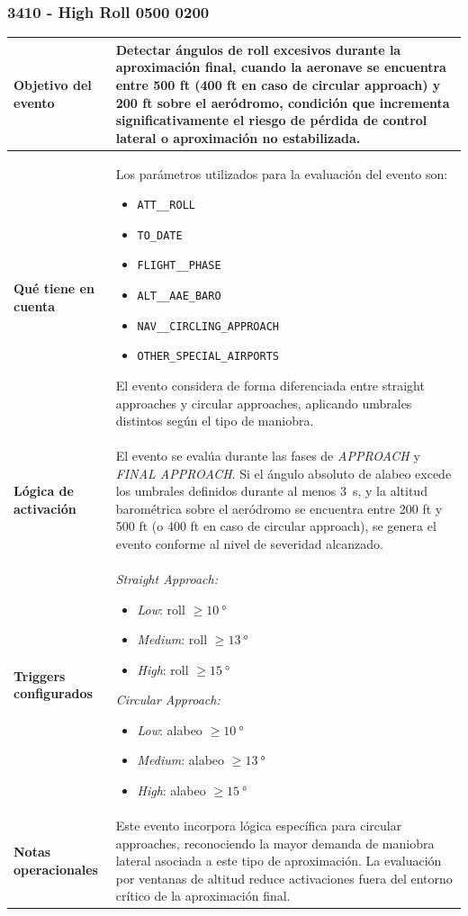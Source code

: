 \documentclass[11pt,a4paper]{article}
\begin{document}
	\subsubsection{3410 - High Roll 0500 0200}
	\begin{longtable}{p{5cm} p{9.5cm}}
		\hline
		\textbf{Objetivo del evento} &
		Detectar ángulos de roll excesivos durante la aproximación final, cuando la aeronave se encuentra entre 500 ft (400 ft en caso de circular approach) y 200 ft sobre el aeródromo, condición que incrementa significativamente el riesgo de pérdida de control lateral o aproximación no estabilizada. \\
		\hline
		\textbf{Qué tiene en cuenta} &
		Los parámetros utilizados para la evaluación del evento son:
		\begin{itemize}
			\item \texttt{ATT\_\_ROLL}
			\item \texttt{TO\_DATE}
			\item \texttt{FLIGHT\_\_PHASE}
			\item \texttt{ALT\_\_AAE\_BARO}
			\item \texttt{NAV\_\_CIRCLING\_APPROACH}
			\item \texttt{OTHER\_SPECIAL\_AIRPORTS}
		\end{itemize}
		El evento considera de forma diferenciada entre straight approaches y circular approaches, aplicando umbrales distintos según el tipo de maniobra. \\
		\hline
		\textbf{Lógica de activación} &
		El evento se evalúa durante las fases de \textit{APPROACH} y \textit{FINAL APPROACH}.  
		Si el ángulo absoluto de alabeo excede los umbrales definidos durante al menos \SI{3}{s}, y la altitud barométrica sobre el aeródromo se encuentra entre 200 ft y 500 ft (o 400 ft en caso de circular approach), se genera el evento conforme al nivel de severidad alcanzado. \\
		\hline
		\textbf{Triggers configurados} &
		\textit{Straight Approach:}
		\begin{itemize}
			\item \textit{Low}: roll $\geq \SI{10}{\degree}$
			\item \textit{Medium}: roll $\geq \SI{13}{\degree}$
			\item \textit{High}: roll $\geq \SI{15}{\degree}$
		\end{itemize}
		\textit{Circular Approach:}
		\begin{itemize}
			\item \textit{Low}: alabeo $\geq \SI{10}{\degree}$
			\item \textit{Medium}: alabeo $\geq \SI{13}{\degree}$
			\item \textit{High}: alabeo $\geq \SI{15}{\degree}$
		\end{itemize} \\
		\hline
		\textbf{Notas operacionales} &
		Este evento incorpora lógica específica para circular approaches, reconociendo la mayor demanda de maniobra lateral asociada a este tipo de aproximación. La evaluación por ventanas de altitud reduce activaciones fuera del entorno crítico de la aproximación final. \\
		\hline
	\end{longtable} \newpage
	
\end{document}
